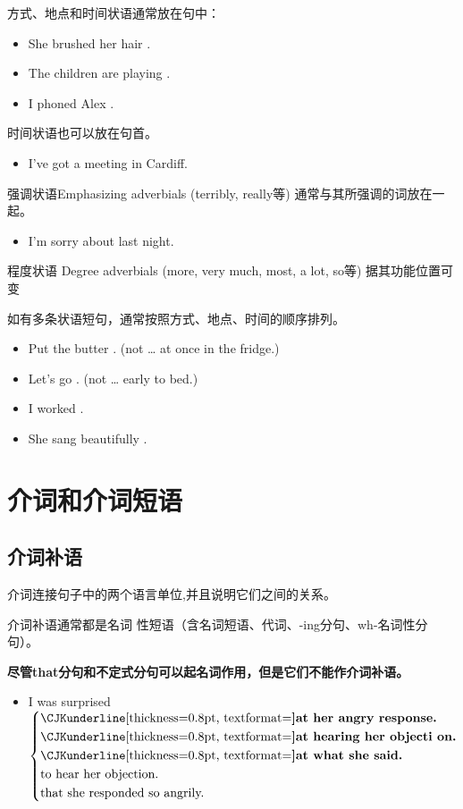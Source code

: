 方式、地点和时间状语通常放在句中：
\begin{itemize}
\item She brushed her hair .
\item The children are playing .
\item I phoned Alex .
\end{itemize}

时间状语也可以放在句首。
\begin{itemize}
\item {} I've got a meeting in Cardiff.
\end{itemize}

强调状语Emphasizing adverbials (terribly, really等) 通常与其所强调的词放在一
起。
\begin{itemize}
\item I'm  sorry about last night.
\end{itemize}

程度状语 Degree adverbials (more, very much, most, a lot, so等) 据其功能位置可变

如有多条状语短句，通常按照方式、地点、时间的顺序排列。
\begin{itemize}
\item Put the butter  . (not … at once in the fridge.)
\item Let's go  . (not … early to bed.)
\item I worked  .
\item She sang beautifully  .
\end{itemize}


\section{介词和介词短语}

\subsection{介词补语}

介词连接句子中的两个语言单位,并且说明它们之间的关系。

介词补语通常都是名词
性短语（含名词短语、代词、-ing分句、wh-名词性分句）。

\textbf{尽管that分句和不定式分句可以起名词作用，但是它们不能作介词补语。}

\begin{itemize}
\item I was surprised $ \left\{
    \begin{aligned}
     &\text{\unbf{at} her angry response.}\\
     &\text{\unbf{at} hearing her objecti on.}\\
     &\text{\unbf{at} what she said.}\\
     &\text{to hear her objection.}\\
     &\text{that she responded so angrily. }
    \end{aligned}
  \right. $

\end{itemize}

